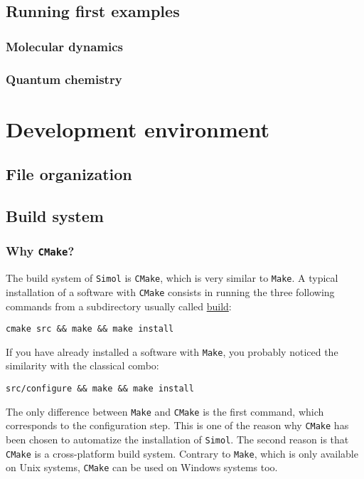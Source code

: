 \documentclass[12pt]{book}
\newcommand{\CMake}{\texttt{CMake}\xspace}
\newcommand{\Make}{\texttt{Make}\xspace}
\newcommand{\Simol}{\texttt{Simol}\xspace}
\begin{document}
\section{Running first examples}

\subsection{Molecular dynamics}

\subsection{Quantum chemistry}


\chapter{Development environment}

\section{File organization}
\section{Build system}

\subsection{Why \CMake?}

The build system of \Simol is \CMake, which is very similar to \Make. A typical installation of a software with \CMake consists in running the three following commands from a subdirectory usually called \url{build}: 
\lstset{language=bash} 
\begin{lstlisting}
cmake src && make && make install
\end{lstlisting}
If you have already installed a software with \Make, you probably noticed the similarity with the classical combo:
\lstset{language=bash} 
\begin{lstlisting}
src/configure && make && make install
\end{lstlisting}
The only difference between \Make and \CMake is the first command, which corresponds to the configuration step. This is one of the reason why \CMake has been chosen to automatize the installation of \Simol. The second reason is that \CMake is a cross-platform build system. Contrary to \Make, which is only available on Unix systems, \CMake can be used on Windows systems too.
\end{document}
